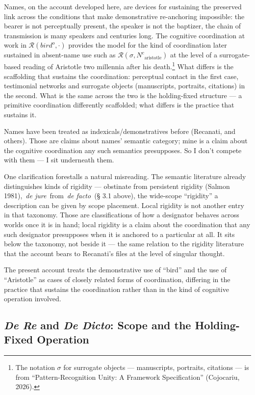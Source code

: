 \documentclass[12pt,a4paper]{article}
\begin{document}
Names, on the account developed here, are devices for sustaining the preserved link across the conditions that make demonstrative re-anchoring impossible: the bearer is not perceptually present, the speaker is not the baptizer, the chain of transmission is many speakers and centuries long. The cognitive coordination at work in \(\mathcal{R}(bird^o, \cdot)\) provides the model for the kind of coordination later sustained in absent-name use such as \(\mathcal{R}(\sigma, {N^c}_\text{aristotle})\) at the level of a surrogate-based reading of Aristotle two millennia after his death.\footnote{The notation \(\sigma\) for surrogate objects --- manuscripts, portraits, citations --- is from ``Pattern-Recognition Unity: A Framework Specification'' (Cojocariu, 2026).} What differs is the scaffolding that sustains the coordination: perceptual contact in the first case, testimonial networks and surrogate objects (manuscripts, portraits, citations) in the second. What is the same across the two is the holding-fixed structure --- a primitive coordination differently scaffolded; what differs is the practice that sustains it.

Names have been treated as indexicals/demonstratives before (Recanati, and others). Those are claims about names' semantic category; mine is a claim about the cognitive coordination any such semantics presupposes. So I don't compete with them --- I sit underneath them.

One clarification forestalls a natural misreading. The semantic literature already distinguishes kinds of rigidity --- obstinate from persistent rigidity (Salmon 1981),~\emph{de jure}~from~\emph{de facto}~(§ 3.1 above), the wide-scope ``rigidity'' a description can be given by scope placement. Local rigidity is not another entry in that taxonomy. Those are classifications of how a designator behaves across worlds once it is in hand; local rigidity is a claim about the coordination that any such designator presupposes when it is anchored to a particular at all. It sits below the taxonomy, not beside it --- the same relation to the rigidity literature that the account bears to Recanati's files at the level of singular thought.

The present account treats the demonstrative use of ``bird'' and the use of ``Aristotle'' as cases of closely related forms of coordination, differing in the practice that sustains the coordination rather than in the kind of cognitive operation involved.

\subsection{\texorpdfstring{\emph{De Re} and \emph{De Dicto}: Scope and the Holding-Fixed Operation}{De Re and De Dicto: Scope and the Holding-Fixed Operation}}\label{de-re-and-de-dicto-scope-and-the-holding-fixed-operation}
\end{document}
